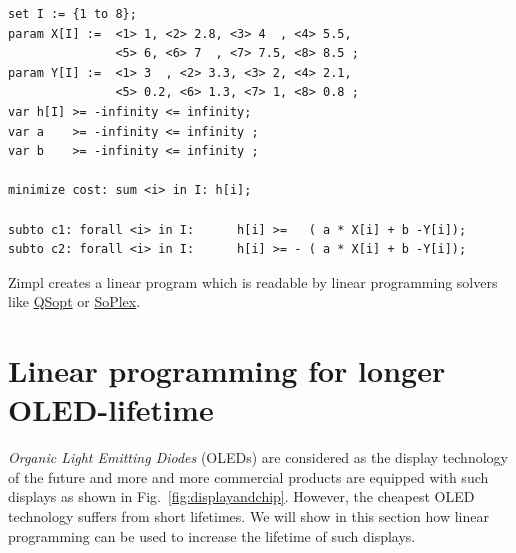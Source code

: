 {\small 
\begin{verbatim}
set I := {1 to 8};
param X[I] :=  <1> 1, <2> 2.8, <3> 4  , <4> 5.5, 
               <5> 6, <6> 7  , <7> 7.5, <8> 8.5 ;
param Y[I] :=  <1> 3  , <2> 3.3, <3> 2, <4> 2.1, 
               <5> 0.2, <6> 1.3, <7> 1, <8> 0.8 ;
var h[I] >= -infinity <= infinity;
var a    >= -infinity <= infinity ;
var b    >= -infinity <= infinity ;

minimize cost: sum <i> in I: h[i];

subto c1: forall <i> in I:      h[i] >=   ( a * X[i] + b -Y[i]);
subto c2: forall <i> in I:      h[i] >= - ( a * X[i] + b -Y[i]);
\end{verbatim}
}
%
\noindent
Zimpl  creates a linear program which is readable by linear
programming solvers like
\href{http://www2.isye.gatech.edu/~wcook/qsopt}{QSopt} or
\href{http://soplex.zib.de/}{SoPlex}. %

    
      



\section{Linear programming for longer OLED-lifetime}



\emph{Organic Light Emitting Diodes} (OLEDs) are considered as the
display technology of the future and  more and more commercial
products are equipped 
with such displays as shown in Fig.~\ref{fig:displayandchip}. However,
the cheapest OLED technology suffers from short lifetimes.
 We will
show in this section how linear programming can be used to increase
the lifetime of such displays. 

